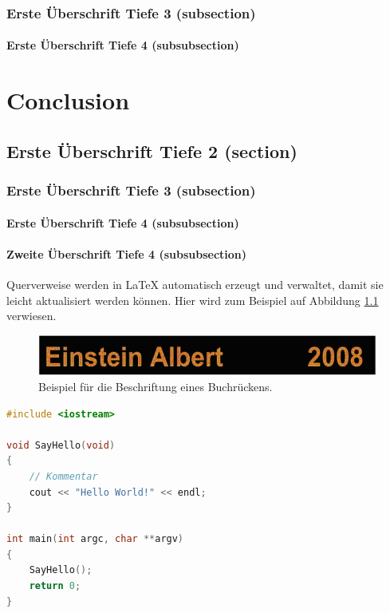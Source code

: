 \documentclass[MMR,Master,nenglish]{twbook}%
\begin{document}
\subsection{Erste Überschrift Tiefe 3 (subsection)}

\subsubsection{Erste Überschrift Tiefe 4 (subsubsection)}


\chapter{Conclusion}

\section{Erste Überschrift Tiefe 2 (section)}

\subsection{Erste Überschrift Tiefe 3 (subsection)}

\subsubsection{Erste Überschrift Tiefe 4 (subsubsection)}


\subsubsection{Zweite Überschrift Tiefe 4 (subsubsection)}

\noindent Querverweise werden in \LaTeX{} automatisch erzeugt und verwaltet, damit sie leicht aktualisiert werden können. Hier wird zum Beispiel auf Abbildung \ref{Abb1} verwiesen.

\begin{figure}[!htbp]
\centering
\includegraphics[width=0.5\linewidth]{PICs/buchruecken}
\caption{Beispiel für die Beschriftung eines Buchrückens.}\label{Abb1}
\end{figure}


\begin{lstlisting}[language=C++,name={1. Beispiel},label={sc:bsp:1}]
#include <iostream>

void SayHello(void)
{
    // Kommentar
    cout << "Hello World!" << endl;
}

int main(int argc, char **argv)
{
    SayHello();
    return 0;
}
\end{lstlisting}
\end{document}
